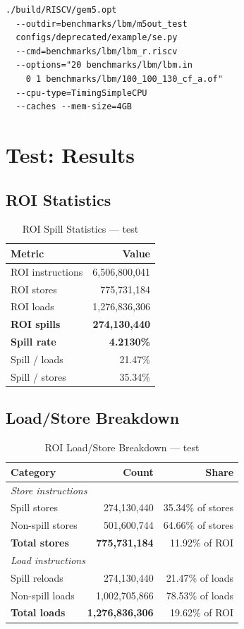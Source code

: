 \documentclass[conference]{IEEEtran}
\begin{document}
\begin{verbatim}
./build/RISCV/gem5.opt
  --outdir=benchmarks/lbm/m5out_test
  configs/deprecated/example/se.py
  --cmd=benchmarks/lbm/lbm_r.riscv
  --options="20 benchmarks/lbm/lbm.in
    0 1 benchmarks/lbm/100_100_130_cf_a.of"
  --cpu-type=TimingSimpleCPU
  --caches --mem-size=4GB
\end{verbatim}

\section{Test: Results}

\subsection{ROI Statistics}

\begin{table}[H]
\centering
\caption{ROI Spill Statistics --- test}
\label{tab:test_roi}
\begin{tabular}{lr}
\toprule
\textbf{Metric} & \textbf{Value} \\
\midrule
ROI instructions    & 6,506,800,041 \\
ROI stores          & 775,731,184 \\
ROI loads           & 1,276,836,306 \\
\midrule
\textbf{ROI spills} & \textbf{274,130,440} \\
\textbf{Spill rate} & \textbf{4.2130\%} \\
Spill / loads       & 21.47\% \\
Spill / stores      & 35.34\% \\
\bottomrule
\end{tabular}
\end{table}

\subsection{Load/Store Breakdown}

\begin{table}[H]
\centering
\caption{ROI Load/Store Breakdown --- test}
\label{tab:test_lsbreakdown}
\begin{tabular}{lrr}
\toprule
\textbf{Category} & \textbf{Count} & \textbf{Share} \\
\midrule
\multicolumn{3}{l}{\textit{Store instructions}} \\
\quad Spill stores     & 274,130,440 & 35.34\% of stores \\
\quad Non-spill stores & 501,600,744 & 64.66\% of stores \\
\quad \textbf{Total stores} & \textbf{775,731,184} & 11.92\% of ROI \\
\midrule
\multicolumn{3}{l}{\textit{Load instructions}} \\
\quad Spill reloads   & 274,130,440 & 21.47\% of loads \\
\quad Non-spill loads & 1,002,705,866 & 78.53\% of loads \\
\quad \textbf{Total loads} & \textbf{1,276,836,306} & 19.62\% of ROI \\
\bottomrule
\end{tabular}
\end{table}
\end{document}
